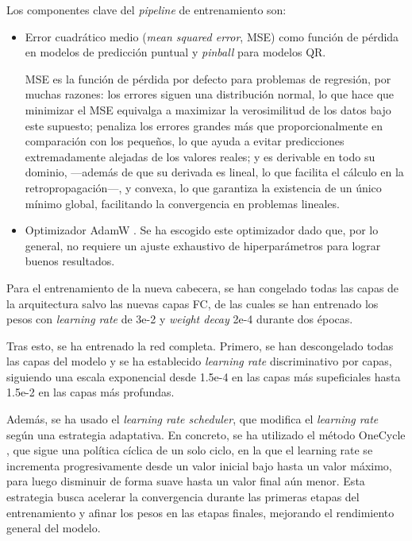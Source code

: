 
Los componentes clave del \textit{pipeline} de entrenamiento son:

\begin{itemize}
    \item Error cuadrático medio (\textit{mean squared error}, MSE) como función de pérdida en modelos de 
    predicción puntual y \textit{pinball} para modelos QR. 
    
    MSE es la función de pérdida por defecto para problemas de regresión, por muchas razones: los errores 
    siguen una distribución normal, lo que hace que minimizar el MSE equivalga a maximizar la verosimilitud 
    de los datos bajo este supuesto; penaliza los errores grandes más que proporcionalmente en comparación 
    con los pequeños, lo que ayuda a evitar predicciones extremadamente alejadas de los valores reales; y es 
    derivable en todo su dominio, ---además de que su derivada es lineal, lo que facilita el cálculo en la 
    retropropagación---, y convexa, lo que garantiza la existencia de un único mínimo global, facilitando la 
    convergencia en problemas lineales.
        
    \item Optimizador AdamW \cite{loshchilov2017}. Se ha escogido este optimizador dado que, por lo general,
    no requiere un ajuste exhaustivo de hiperparámetros para lograr buenos resultados. 
    
\end{itemize}

Para el entrenamiento de la nueva cabecera, se han congelado todas las capas de la arquitectura salvo las 
nuevas capas FC, de las cuales se han entrenado los pesos con \textit{learning rate} de 3e-2 y 
\textit{weight decay} 2e-4 durante dos épocas. 

Tras esto, se ha entrenado la red completa. Primero, se han descongelado todas las capas del modelo y se ha 
establecido \textit{learning rate} discriminativo por capas, siguiendo una escala exponencial desde 1.5e-4 en 
las capas más supeficiales hasta 1.5e-2 en las capas más profundas. 

Además, se ha usado el \textit{learning rate scheduler}, que modifica el \textit{learning rate} según una 
estrategia adaptativa. En concreto, se ha utilizado el método OneCycle \cite{smith2018}, que sigue una 
política cíclica de un solo ciclo, en la que el learning rate se incrementa progresivamente desde un valor 
inicial bajo hasta un valor máximo, para luego disminuir de forma suave hasta un valor final aún menor. Esta 
estrategia busca acelerar la convergencia durante las primeras etapas del entrenamiento y afinar los pesos en 
las etapas finales, mejorando el rendimiento general del modelo.


